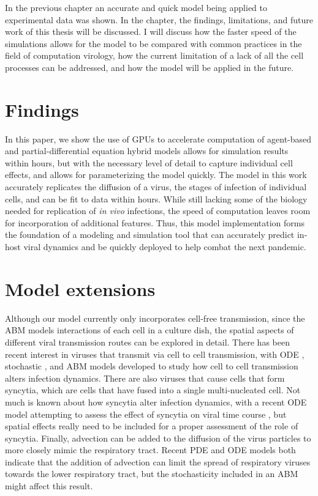 In the previous chapter an accurate and quick model being applied to experimental data was shown. In the chapter, the findings, limitations, and future work of this thesis will be discussed. I will discuss how the faster speed of the simulations allows for the model to be compared with common practices in the field of computation virology, how the current limitation of a lack of all the cell processes can be addressed, and how the model will be applied in the future.

\section{Findings}

In this paper, we show the use of GPUs to accelerate computation of agent-based and partial-differential equation hybrid models allows for simulation results within hours, but with the necessary level of detail to capture individual cell effects, and allows for parameterizing the model quickly. The model in this work accurately replicates the diffusion of a virus, the stages of infection of individual cells, and can be fit to data within hours. While still lacking some of the biology needed for replication of \emph{in vivo} infections, the speed of computation leaves room for incorporation of additional features. Thus, this model implementation forms the foundation of a modeling and simulation tool that can accurately predict in-host viral dynamics and be quickly deployed to help combat the next pandemic.

\section{Model extensions}

Although our model currently only incorporates cell-free transmission, since the ABM models interactions of each cell in a culture dish, the spatial aspects of different viral transmission routes can be explored in detail. There has been recent interest in viruses that transmit via cell to cell transmission, with ODE \citep{allen15,komarova13,iwami15}, stochastic \citep{graw15}, and ABM \citep{kumberger18,blahut21} models developed to study how cell to cell transmission alters infection dynamics. There are also viruses that cause cells that form syncytia, which are cells that have fused into a single multi-nucleated cell. Not much is known about how syncytia alter infection dynamics, with a recent ODE model attempting to assess the effect of syncytia on viral time course \citep{jessie21}, but spatial effects really need to be included for a proper assessment of the role of syncytia. Finally, advection can be added to the diffusion of the virus particles to more closely mimic the respiratory tract. Recent PDE \citep{quirouette20} and ODE \citep{gonzalez19} models both indicate that the addition of advection can limit the spread of respiratory viruses towards the lower respiratory tract, but the stochasticity included in an ABM might affect this result. 

